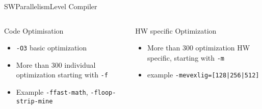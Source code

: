 %
\begin{Frame}{SWParallelismLevel Compiler}
  \begin{columns}[t]
    \begin{column}{\HW} %
      \begin{block}{Code Optimisation}
        \begin{itemize}
        \item \texttt{-O3} basic optimization
        \item More than 300 individual optimization starting with \texttt{-f}
        \item Example \texttt{-ffast-math}, \texttt{-floop-strip-mine}
        \end{itemize}
      \end{block} 
    \end{column}
    
    \begin{column}{\HW} %
      \begin{block}{HW specific Optimization}
        \begin{itemize}
        \item More than 300 optimization HW specific, starting with
          \texttt{-m}
        \item example \texttt{-mevexlig=[128|256|512]}
        \end{itemize}
      \end{block}   
    \end{column}
  \end{columns}  
\end{Frame}


